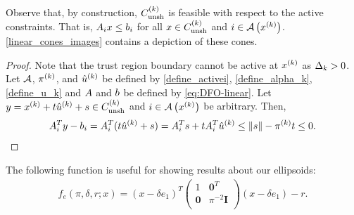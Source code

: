 
Observe that, by construction, ${C^{(k)}_{\textrm{unsh}}}$ is feasible with respect to the active constraints.
That is, ${A}_i x \le {b}_i$ for all $x \in {C^{(k)}_{\textrm{unsh}}}$ and $i \in {\mathcal A}\left(x^{(k)}\right)$.
\cref{linear_cones_images} contains a depiction of these cones.




\begin{proof}

Note that the trust region boundary cannot be active at $x^{(k)}$ as $\Delta_k > 0$.
Let ${\mathcal A}$, $\pi^{(k)}$, and ${{{\hat u}^{(k)}}}$ be defined by \cref{define_activei}, \cref{define_alpha_k}, \cref{define_u_k} and
${A}$ and ${b}$ be defined by \cref{eq:DFO-linear}.
Let $y = x^{(k)} + t{{{\hat u}^{(k)}}} + s \in {C^{(k)}_{\textrm{unsh}}}$ and $i \in {\mathcal A}\left(x^{(k)}\right)$ be arbitrary.
Then,
\begin{align*}
{{A}}_{i}^Ty - {{b}}_{i} = {{A}}_{i}^T(t{{{\hat u}^{(k)}}} + s) = {{A}}_{i}^Ts + t {{A}}_{i}^T{{{\hat u}^{(k)}}} \le \|s\| - \pi^{(k)} t \le 0.
\end{align*}
\end{proof}

The following function is useful for showing results about our ellipsoids:
\begin{align}
f_{e}(\pi, \delta, r; x) = (x - \delta e_1)^T
\begin{pmatrix}
1 & \boldsymbol0^T \\
\boldsymbol 0 & \pi^{-2} \boldsymbol I \\
\end{pmatrix}
(x - \delta e_1) - r. \label{define_ellipsoid_function}
\end{align}

